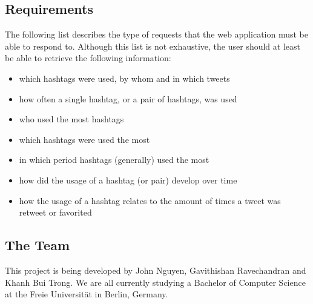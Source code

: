 \documentclass[a4paper, 12pt]{report}
\begin{document}
\subsection{Requirements}
The following list describes the type of requests that the web application must be able to respond to. Although this list is not exhaustive, the user should at least be able to retrieve the following information:
\begin{itemize}
  \item which hashtags were used, by whom and in which tweets
  \item how often a single hashtag, or a pair of hashtags, was used
  \item who used the most hashtags
  \item which hashtags were used the most
  \item in which period  hashtags (generally) used the most
  \item how did the usage of a hashtag (or pair) develop over time
  \item how the usage of a hashtag relates to the amount of times a tweet was retweet or favorited
\end{itemize}


\subsection{The Team}
This project is being developed by John Nguyen, Gavithishan Ravechandran and Khanh Bui Trong. We are all currently studying a Bachelor of Computer Science at the Freie Universität in Berlin, Germany.

\newpage
\end{document}
